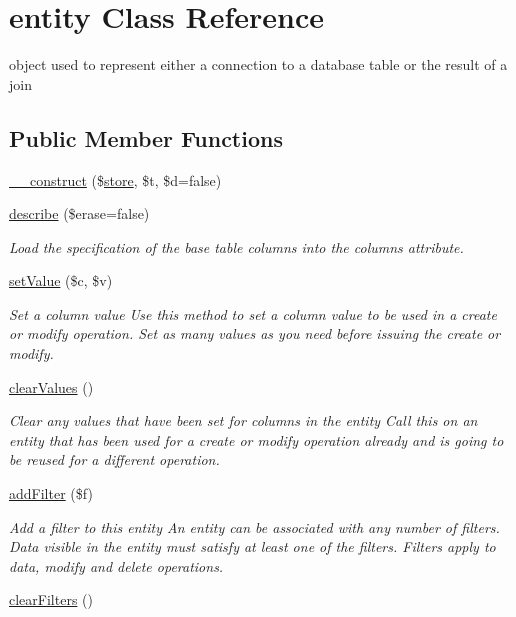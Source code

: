 \hypertarget{classentity}{}\section{entity Class Reference}
\label{classentity}


object used to represent either a connection to a database table or the result of a join  


\subsection*{Public Member Functions}
\begin{DoxyCompactItemize}
\item 
\hyperlink{classentity_a2411a96bf911703bf07e8bac90ffa7f7}{\+\_\+\+\_\+construct} (\$\hyperlink{classstore}{store}, \$t, \$d=false)
\item 
\hyperlink{classentity_a3782e4d51b5f4e688676843e12450a94}{describe} (\$erase=false)
\begin{DoxyCompactList}\small\item\em Load the specification of the base table columns into the columns attribute. \end{DoxyCompactList}\item 
\hyperlink{classentity_a11cae02dda3cc8b9ad4966e33ef11a2a}{set\+Value} (\$c, \$v)
\begin{DoxyCompactList}\small\item\em Set a column value Use this method to set a column value to be used in a create or modify operation. Set as many values as you need before issuing the create or modify. \end{DoxyCompactList}\item 
\hypertarget{classentity_a7afa5fa5ccc2f9b9a0390cad59ecfede}{}\hyperlink{classentity_a7afa5fa5ccc2f9b9a0390cad59ecfede}{clear\+Values} ()\label{classentity_a7afa5fa5ccc2f9b9a0390cad59ecfede}

\begin{DoxyCompactList}\small\item\em Clear any values that have been set for columns in the entity Call this on an entity that has been used for a create or modify operation already and is going to be reused for a different operation. \end{DoxyCompactList}\item 
\hyperlink{classentity_a7041812e724f4d4e92f7350ac1ca4730}{add\+Filter} (\$f)
\begin{DoxyCompactList}\small\item\em Add a filter to this entity An entity can be associated with any number of filters. Data visible in the entity must satisfy at least one of the filters. Filters apply to data, modify and delete operations. \end{DoxyCompactList}\item 
\hypertarget{classentity_a3c82e6e7a3a2c79306206db541d2a343}{}\hyperlink{classentity_a3c82e6e7a3a2c79306206db541d2a343}{clear\+Filters} ()\label{classentity_a3c82e6e7a3a2c79306206db541d2a343}


\end{DoxyCompactItemize}
